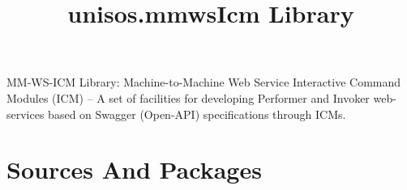 \documentclass{article}
\begin{document}


\begin{comment}
*  [[elisp:(org-cycle)][| ]]  *DBLK: front-begin*                                       :: [[elisp:(beginning-of-buffer)][Top]] [[elisp:(delete-other-windows)][(1)]]  [[elisp:(org-cycle)][| ]]
\end{comment}


\begin{comment}
*  [[elisp:(org-cycle)][| ]]  *DBLK: copyright*                                       :: [[elisp:(beginning-of-buffer)][Top]] [[elisp:(delete-other-windows)][(1)]]  [[elisp:(org-cycle)][| ]]
\end{comment}


\begin{comment}
*  [[elisp:(org-cycle)][| ]]  *DBLK: front-end*                                       :: [[elisp:(beginning-of-buffer)][Top]] [[elisp:(delete-other-windows)][(1)]]  [[elisp:(org-cycle)][| ]]
\end{comment}


\begin{comment}
*  [[elisp:(org-cycle)][| ]]  *DBLK: main-begin*                                       :: [[elisp:(beginning-of-buffer)][Top]] [[elisp:(delete-other-windows)][(1)]]  [[elisp:(org-cycle)][| ]]
\end{comment}

\title{unisos.mmwsIcm Library}


\thispagestyle{empty}


\bigskip

MM-WS-ICM Library: Machine-to-Machine Web Service Interactive Command Modules (ICM) -- A
set of facilities for developing Performer and Invoker web-services based on Swagger (Open-API) specifications through ICMs.

\section{Sources And Packages}
\end{document}
